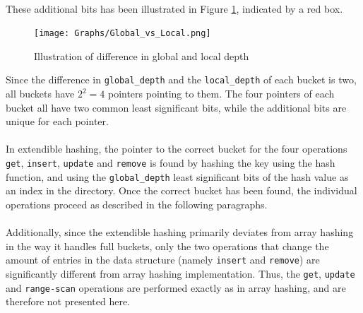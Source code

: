 \documentclass[11pt]{report} %
\begin{document}
\\
These additional bits has been illustrated in Figure \ref{fig:global_vs_local}, indicated by a red box. 
\begin{figure}[H]
  \centering
  \texttt{[image: Graphs/Global\_vs\_Local.png]}
  \caption{Illustration of difference in global and local depth}
  \label{fig:global_vs_local}
\end{figure}
\noindent
Since the difference in \verb|global_depth| and the \verb|local_depth| of each bucket is two, all buckets have $2^2 = 4$ pointers pointing to them. The four pointers of each bucket all have two common least significant bits, while the additional bits are unique for each pointer.\\
\\
In extendible hashing, the pointer to the correct bucket for the four operations \verb|get|, \verb|insert|, \verb|update| and \verb|remove| is found by hashing the key using the hash function, and using the \verb|global_depth| least significant bits of the hash value as an index in the directory. Once the correct bucket has been found, the individual operations proceed as described in the following paragraphs. \\
\\
Additionally, since the extendible hashing primarily deviates from array hashing in the way it handles full buckets, only the two operations that change the amount of entries in the data structure (namely \verb|insert| and \verb|remove|) are significantly different from array hashing implementation. Thus, the \verb|get|, \verb|update| and \verb|range-scan| operations are performed exactly as in array hashing, and are therefore not presented here.
\end{document}
